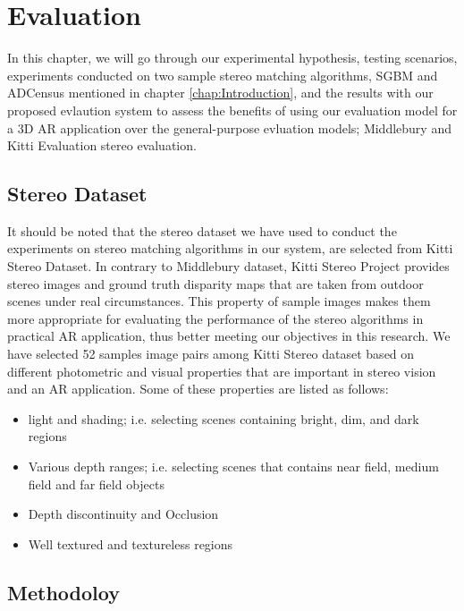 \chapter{Evaluation}
\label{chap:Evaluation}

In this chapter, we will go through our experimental hypothesis, testing scenarios, experiments conducted on two sample 
stereo matching algorithms, SGBM and ADCensus mentioned in chapter \ref{chap:Introduction}, and the results with our
proposed evlaution system to assess the benefits of using our evaluation model for a 3D AR application over the general-purpose evluation models; 
Middlebury and Kitti Evaluation stereo evaluation.

\section{Stereo Dataset}
It should be noted that the stereo dataset we have used to conduct the experiments on stereo matching algorithms in our system,
are selected from Kitti Stereo Dataset.
In contrary to Middlebury dataset, Kitti Stereo Project provides stereo images and ground truth disparity maps
that are taken from outdoor scenes under real circumstances. This property of sample images makes them more appropriate 
for evaluating the performance of the stereo algorithms in practical AR application, thus better meeting our objectives in this research.
We have selected 52 samples image pairs among Kitti Stereo dataset based on different photometric and visual properties that are important
in stereo vision and an AR application. Some 
of these properties are listed as follows:
\begin{itemize}
\item light and shading; i.e. selecting scenes containing bright, dim, and dark regions
\item Various depth ranges; i.e. selecting scenes that contains near field, medium field and far field objects  
\item Depth discontinuity and Occlusion
\item Well textured and textureless regions
\end{itemize}


\section{Methodoloy}

